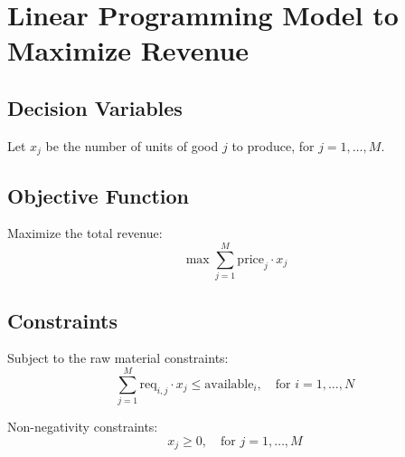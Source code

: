 \documentclass{article}
\begin{document}
\section*{Linear Programming Model to Maximize Revenue}

\subsection*{Decision Variables}
Let \( x_j \) be the number of units of good \( j \) to produce, for \( j = 1, \ldots, M \).

\subsection*{Objective Function}
Maximize the total revenue:
\[
\max \sum_{j=1}^{M} \text{price}_j \cdot x_j
\]

\subsection*{Constraints}
Subject to the raw material constraints:
\[
\sum_{j=1}^{M} \text{req}_{i,j} \cdot x_j \leq \text{available}_i, \quad \text{for } i = 1, \ldots, N
\]

Non-negativity constraints:
\[
x_j \geq 0, \quad \text{for } j = 1, \ldots, M
\]
\end{document}
